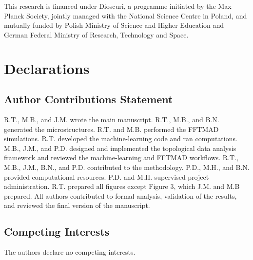 \documentclass[sn-mathphys,Numbered]{sn-jnl}
\theoremstyle{definition}
\begin{document}
This research is financed under Dioscuri, a programme initiated by the
Max Planck Society, jointly managed with the National Science Centre
in Poland, and mutually funded by Polish Ministry of Science and
Higher Education and German Federal Ministry of Research,
Technology and Space.

\section*{Declarations}
\subsection*{Author Contributions Statement}
R.T., M.B., and J.M. wrote the main manuscript. R.T., M.B., and B.N. generated the microstructures. R.T. and M.B. performed the FFTMAD simulations. R.T. developed the machine-learning code and ran computations. M.B., J.M., and P.D. designed and implemented the topological data analysis framework and reviewed the machine-learning and FFTMAD workflows. R.T., M.B., J.M., B.N., and P.D. contributed to the methodology. P.D., M.H., and B.N. provided computational resources. P.D. and M.H. supervised project administration. R.T. prepared all figures except Figure 3, which J.M. and M.B prepared. All authors contributed to formal analysis, validation of the results, and reviewed the final version of the manuscript. 

\subsection*{Competing Interests}
The authors declare no competing interests.

\clearpage

\setcounter{section}{0}
\setcounter{figure}{0}
\setcounter{table}{0}
\setcounter{equation}{0}

\renewcommand{\thesection}{S\arabic{section}}
\renewcommand{\thesubsection}{S\arabic{section}.\arabic{subsection}}
\renewcommand{\thesubsubsection}{S\arabic{section}.\arabic{subsection}.\arabic{subsubsection}}
\renewcommand{\thefigure}{S\arabic{figure}}
\renewcommand{\thetable}{S\arabic{table}}
\renewcommand{\theequation}{S\arabic{equation}}


\clearpage



\end{document}
